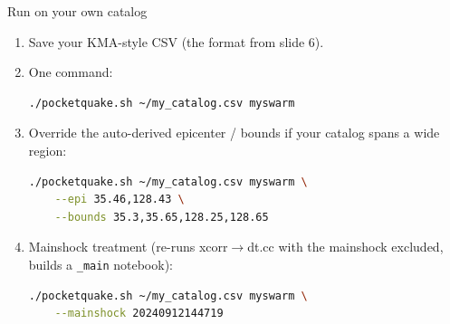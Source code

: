 \documentclass[10pt,aspectratio=169]{beamer}
\begin{document}
\begin{frame}[fragile]{Run on your own catalog}
\begin{enumerate}
  \item Save your KMA-style CSV (the format from slide 6).
  \item One command:
\begin{lstlisting}[language=bash]
./pocketquake.sh ~/my_catalog.csv myswarm
\end{lstlisting}
  \item Override the auto-derived epicenter / bounds if your catalog spans
        a wide region:
\begin{lstlisting}[language=bash]
./pocketquake.sh ~/my_catalog.csv myswarm \
    --epi 35.46,128.43 \
    --bounds 35.3,35.65,128.25,128.65
\end{lstlisting}
  \item Mainshock treatment (re-runs xcorr$\to$dt.cc with the mainshock
        excluded, builds a \texttt{\_main} notebook):
\begin{lstlisting}[language=bash]
./pocketquake.sh ~/my_catalog.csv myswarm \
    --mainshock 20240912144719
\end{lstlisting}
\end{enumerate}
\end{frame}
\end{document}
